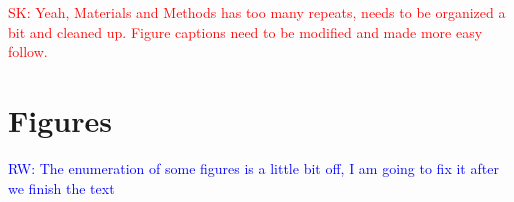 \documentclass{bmcart}
\newcommand{\SK}[1]{\textcolor{red}{SK: #1}}
\newcommand{\RW}[1]{\textcolor{blue}{RW: #1}}
\begin{document}
\SK{Yeah, Materials and Methods has too many repeats, needs to be
  organized a bit and cleaned up. Figure captions need to be modified
  and made more easy follow. } 

  
\nocite{exo_gb}
\nocite{maplot1}
\nocite{maplot2}
\nocite{chipbeyond}
\nocite{meme}




\newpage

\section{Figures}


\RW{The enumeration of some figures is a little bit off, I am going to
  fix it after we finish the text}
\end{document}
